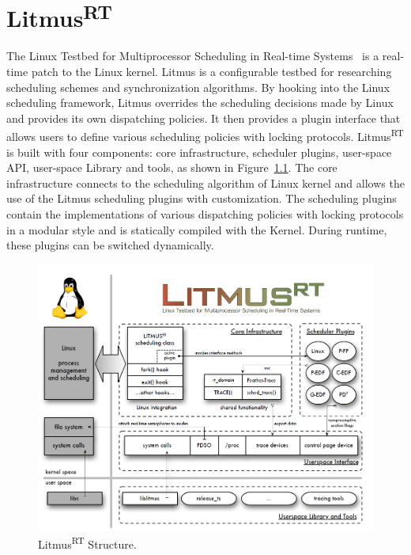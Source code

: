 \documentclass{report}
\begin{document}
\chapter{Litmus\textsuperscript{RT}}
\label{litmus}
The Linux Testbed for Multiprocessor Scheduling in Real-time Systems~\cite{calandrino2006litmus, brandenburg2011scheduling} is a real-time patch to the Linux kernel. Litmus is a configurable testbed for researching scheduling schemes and synchronization algorithms. By hooking into the Linux scheduling framework, Litmus overrides the scheduling decisions made by Linux and provides its own dispatching policies. It then provides a plugin interface that allows users to define various scheduling policies with locking protocols. Litmus\textsuperscript{RT} is built with four components: core infrastructure, scheduler plugins, user-space API, user-space Library and tools, as shown in Figure~\ref{litmusxx}. The core infrastructure connects to the scheduling algorithm of Linux kernel and allows the use of the Litmus scheduling plugins with customization. The scheduling plugins contain the implementations of various dispatching policies with locking protocols in a modular style and is statically compiled with the Kernel. During runtime, these plugins can be switched dynamically.

\begin{figure}[h]
\centering
\includegraphics[width=.8\columnwidth]{graphics/litmus.png}
\caption{Litmus\textsuperscript{RT} Structure.}
\label{litmusxx}
\end{figure}
\end{document}
